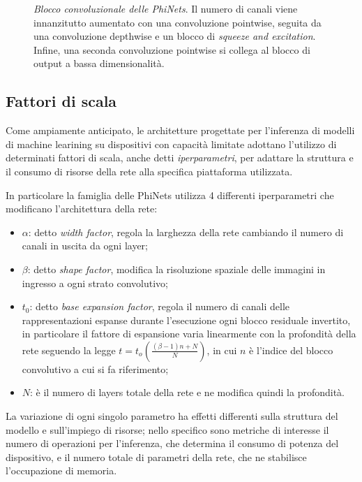 \begin{figure}[ht!]
    \centering
    \caption{\textit{Blocco convoluzionale delle PhiNets}. Il numero di canali viene innanzitutto aumentato con una convoluzione pointwise, seguita da una convoluzione depthwise e un blocco di \textit{squeeze and excitation}. Infine, una seconda convoluzione pointwise si collega al blocco di output a bassa dimensionalità.}
    \label{fig:phinetsconvblock}
\end{figure}

\subsection{Fattori di scala}
Come ampiamente anticipato, le architetture progettate per l'inferenza di modelli di machine learining su dispositivi con capacità limitate adottano l'utilizzo di determinati fattori di scala, anche detti \textit{iperparametri}, per adattare la struttura e il consumo di risorse della rete alla specifica piattaforma utilizzata.

In particolare la famiglia delle PhiNets utilizza 4 differenti iperparametri che modificano l'architettura della rete:

\begin{itemize}
    \item $\alpha$: detto \textit{width factor}, regola la larghezza della rete cambiando il numero di canali in uscita da ogni layer;
    \item $\beta$: detto \textit{shape factor}, modifica la risoluzione spaziale delle immagini in ingresso a ogni strato convolutivo;
    \item $t_{0}$: detto \textit{base expansion factor}, regola il numero di canali delle rappresentazioni espanse durante l'esecuzione ogni blocco residuale invertito, in particolare il fattore di espansione varia linearmente con la profondità della rete seguendo la legge $t = t_{o}\left( \frac{(\beta-1)n + N}{N} \right)$, in cui $n$ è l'indice del blocco convolutivo a cui si fa riferimento;
    \item $N$: è il numero di layers totale della rete e ne modifica quindi la profondità.
\end{itemize}

La variazione di ogni singolo parametro ha effetti differenti sulla struttura del modello e sull'impiego di risorse; nello specifico sono metriche di interesse il numero di operazioni per l'inferenza, che determina il consumo di potenza del dispositivo, e il numero totale di parametri della rete, che ne stabilisce l'occupazione di memoria.

